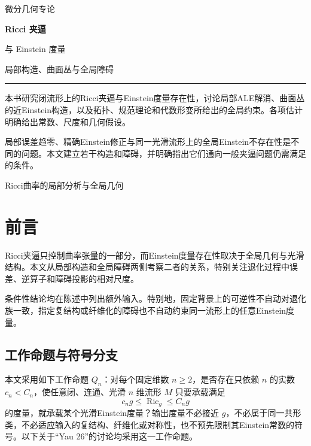 \documentclass[UTF8,fontset=fandol,zihao=-4,oneside,openany]{ctexbook}
\theoremstyle{cjkplain}
\numberwithin{equation}{chapter}
\DeclareMathOperator{\Ric}{Ric}
\begin{document}
\frontmatter


\begin{titlepage}
\centering
\vspace*{22mm}
{\sffamily\large 微分几何专论\par}
\vspace{12mm}
{\sffamily\bfseries\fontsize{30}{40}\selectfont Ricci 夹逼\par 与 Einstein 度量\par}
\vspace{9mm}
{\Large 局部构造、曲面丛与全局障碍\par}
\vspace{12mm}
{\color{ink}\rule{0.72\textwidth}{0.7pt}\par}
\vspace{10mm}
\begin{minipage}{0.77\textwidth}
\normalsize
本书研究闭流形上的Ricci夹逼与Einstein度量存在性，讨论局部ALE解消、曲面丛的近Einstein构造，以及拓扑、规范理论和代数形变所给出的全局约束。各项估计明确给出常数、尺度和几何假设。

\medskip
局部误差趋零、精确Einstein修正与同一光滑流形上的全局Einstein不存在性是不同的问题。本文建立若干构造和障碍，并明确指出它们通向一般夹逼问题仍需满足的条件。
\end{minipage}
\vfill
{\large Ricci曲率的局部分析与全局几何\par}
\vspace{10mm}
\end{titlepage}

\chapter*{前言}
Ricci夹逼只控制曲率张量的一部分，而Einstein度量存在性取决于全局几何与光滑结构。本文从局部构造和全局障碍两侧考察二者的关系，特别关注退化过程中误差、逆算子和障碍投影的相对尺度。

条件性结论均在陈述中列出额外输入。特别地，固定背景上的可逆性不自动对退化族一致，指定复结构或纤维化的障碍也不自动约束同一流形上的任意Einstein度量。

\section*{工作命题与符号分支}
本文采用如下工作命题 $Q_n$：对每个固定维数 $n\ge2$，是否存在只依赖 $n$ 的实数 $c_n<C_n$，使任意闭、连通、光滑 $n$ 维流形 $M$ 只要承载满足
\[
c_ng\le\Ric_g\le C_ng
\]
的度量，就承载某个光滑Einstein度量？输出度量不必接近 $g$，不必属于同一共形类，不必适应输入的复结构、纤维化或对称性，也不预先限制其Einstein常数的符号。以下关于“Yau 26”的讨论均采用这一工作命题。
\end{document}
